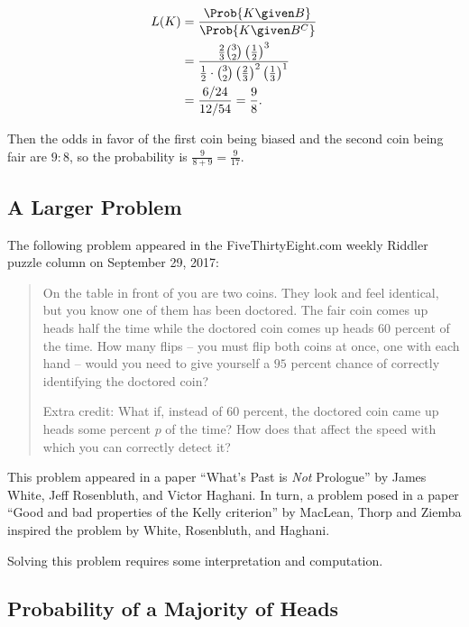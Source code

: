 \documentclass[12pt]{article}
\begin{document}
\begin{align*}
    L(K) &= \frac{\Prob{K \given B}}{\Prob{K \given B^C}} \\
    &= \frac{\frac{2}{3} \binom{3}{2} \left( \frac{1}{2} \right)^3}{\frac{1}{2} \cdot
    \binom{3}{2} \left( \frac{2}{3} \right)^2 \left(\frac{1}{3} \right)^1} \\
    &= \frac{6/24}{12/54} = \frac{9}{8}.
\end{align*}

Then the odds in favor of the first coin being biased and the second
coin being fair are \( 9 :  8 \), so the probability is \( \frac{9}{8+9}
= \frac{9}{17} \).

\subsection*{A Larger Problem}

The following problem appeared in the FiveThirtyEight.com weekly Riddler
puzzle column on September 29, 2017:

\begin{quotation}
    On the table in front of you are two coins.  They look and feel
    identical, but you know one of them has been doctored.  The fair
    coin comes up heads half the time while the doctored coin comes up
    heads \( 60 \) percent of the time.  How many flips -- you must
    flip both coins at once, one with each hand -- would you need to
    give yourself a \( 95 \) percent chance of correctly identifying the
    doctored coin?

    Extra credit:  What if, instead of \( 60 \) percent, the doctored
    coin came up heads some percent \( p \) of the time?  How does that
    affect the speed with which you can correctly detect it?
\end{quotation}

This problem appeared in a paper ``What's Past is \emph{Not} Prologue''
by James White, Jeff Rosenbluth, and Victor Haghani.  In turn, a problem
posed in a paper ``Good and bad properties of the Kelly criterion'' by
MacLean, Thorp and Ziemba inspired the problem by White, Rosenbluth, and
Haghani.

Solving this problem requires some interpretation and computation.

\subsection*{Probability of a Majority of Heads}
\end{document}
